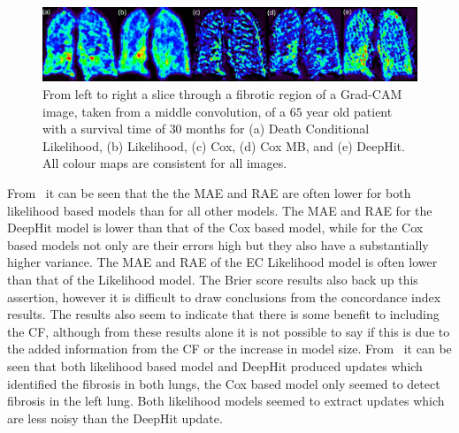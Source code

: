         \begin{figure}\centering
    
            \includegraphics[width=1.0\linewidth]{figures/survival_analysis_grad_cam_label.png}
            
            \captionsetup{singlelinecheck=false, justification=centering}
            \caption{
                From left to right a slice through a fibrotic region of a \gls{Grad-CAM} image, taken from a middle convolution, of a $65$ year old patient with a survival time of $30$ months for (a) Death Conditional Likelihood, (b) Likelihood, (c) Cox, (d) Cox \gls{MB}, and (e) DeepHit. All colour maps are consistent for all images.
            }
            \label{fig:deep_learning_for_ct_based_survival_analysis_of_idiopathic_pulmonary_fibrosis_patients_appendix_results_grad_cam}
       \end{figure}
    
        From~ it can be seen that the the \gls{MAE} and \gls{RAE} are often lower for both likelihood based models than for all other models. The \gls{MAE} and \gls{RAE} for the DeepHit model is lower than that of the Cox based model, while for the Cox based models not only are their errors high but they also have a substantially higher variance. The \gls{MAE} and \gls{RAE} of the \gls{EC} Likelihood model is often lower than that of the Likelihood model. The Brier score results also back up this assertion, however it is difficult to draw conclusions from the concordance index results. The results also seem to indicate that there is some benefit to including the \gls{CF}, although from these results alone it is not possible to say if this is due to the added information from the \gls{CF} or the increase in model size. From~ it can be seen that both likelihood based model and DeepHit produced updates which identified the fibrosis in both lungs, the Cox based model only seemed to detect fibrosis in the left lung. Both likelihood models seemed to extract updates which are less noisy than the DeepHit update.
    
